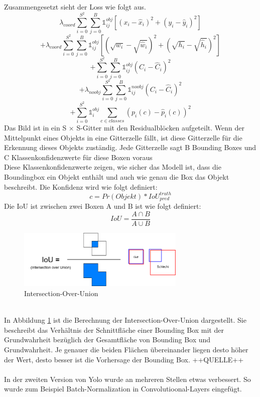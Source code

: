 \documentclass[conference]{IEEEtran}
\begin{document}
	Zusammengesetzt sieht der Loss wie folgt aus.
	\[ \lambda_{coord} \sum_{i=0}^{S^2}\sum_{j=0}^{B} \mathbb{1}_{i j}^{obj} [(x_i - \hat{x}_i )^2 + (y_i - \hat{y}_i )^2] \]
	\[ + \lambda_{coord} \sum_{i=0}^{S^2}\sum_{j=0}^{B} \mathbb{1}_{i j}^{obj} [(\sqrt{w_i} - \sqrt{\hat{w}_i} )^2 + (\sqrt{h_i} - \sqrt{\hat{h}_i} )^2] \]
	\[ + \sum_{i=0}^{S^2}\sum_{j=0}^{B} \mathbb{1}_{i j}^{obj} (C_i - \hat{C}_i)^2 \]
	\[ + \lambda_{noobj} \sum_{i=0}^{S^2}\sum_{j=0}^{B} \mathbb{1}_{i j}^{noobj} (C_i - \hat{C}_i)^2 \]
	\[ + \sum_{i=0}^{S^2} \mathbb{1}_{i}^{obj} \sum_{c \in classes} (p_i(c) - \hat{p}_i(c))^2 \]
	Das Bild ist in ein S × S-Gitter mit den Residualblöcken aufgeteilt. Wenn der Mittelpunkt eines Objekts in eine Gitterzelle fällt, ist diese Gitterzelle für die Erkennung dieses Objekts zuständig. Jede Gitterzelle sagt B Bounding Boxes und C Klassenkonfidenzwerte für diese Boxen voraus \cite{b1}\\
	Diese Klassenkonfidenzwerte zeigen, wie sicher das Modell ist, dass die Boundingbox ein Objekt enthält und auch wie genau die Box das Objekt beschreibt. Die Konfidenz wird wie folgt definiert:
	\[ c = Pr(Objekt) * IoU_{pred}^{truth} \]
	Die IoU ist zwischen zwei Boxen A und B ist wie folgt definiert:
	\[ IoU = \frac{A \cap B}{A \cup B} \]
	\begin{figure}[h]
		\begin{center}
			\includegraphics[width=8cm]{Media/Iou.png}
			\caption{Intersection-Over-Union}
			\label{IoU}
		\end{center}
	\end{figure}\\
	In Abbildung \ref{IoU} ist die Berechnung der Intersection-Over-Union dargestellt. Sie beschreibt das Verhältnis der Schnittfläche einer Bounding Box mit der Grundwahrheit bezüglich der Gesamtfläche von Bounding Box und Grundwahrheit. Je genauer die beiden Flächen übereinander liegen desto höher der Wert, desto besser ist die Vorhersage der Bounding Box. ++QUELLE++\\
	\\
	In der zweiten Version von Yolo wurde an mehreren Stellen etwas verbessert. So wurde zum Beispiel Batch-Normalization in Convolutioonal-Layers eingefügt.\\
\end{document}
